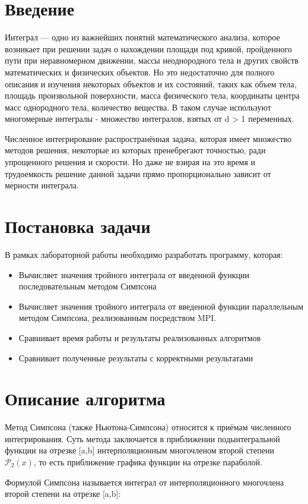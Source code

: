 \documentclass{report}
\begin{document}
\section*{Введение}
Интеграл — одно из важнейших понятий математического анализа, которое возникает при решении задач о нахождении площади под кривой, пройденного пути при неравномерном движении, массы неоднородного тела и других свойств математических и физических объектов. Но это недостаточно для полного описания и изучения некоторых объектов и их состояний, таких как объем тела, площадь произвольной поверхности, масса физического тела, координаты центра масс однородного тела, количество вещества. В таком случае используют многомерные интегралы - множество интегралов, взятых от d > 1 переменных.
\par Численное интегрирование распространённая задача, которая имеет множество методов решения, некоторые из которых пренебрегают точностью, ради упрощенного решения и скорости. Но даже не взирая на это время и трудоемкость решение данной задачи прямо пропорционально зависит от мерности интеграла.

\newpage


\section*{Постановка задачи}
В рамках лабораторной работы необходимо разработать программу, которая:  
\begin{itemize}
    \item Вычисляет значения тройного интеграла от введенной функции последовательным методом Симпсона
    \item Вычисляет значения тройного интеграла от введенной функции параллельным методом Симпсона, реализованным посредством MPI.
    \item Сравнивает время работы и результаты реализованных алгоритмов
    \item Сравнивает полученные результаты с корректными результатами

\end{itemize}
\newpage


\section*{Описание алгоритма}
Метод Симпсона (также Ньютона-Симпсона) относится к приёмам численного интегрирования. Суть метода заключается в приближении подынтегральной функции на отрезке [a,b] интерполяционным многочленом второй степени $\mathcal P_{2}(x)$, то есть приближение графика функции на отрезке параболой.
\par
Формулой Симпсона называется интеграл от интерполяционного многочлена второй степени на отрезке [a,b]:
\end{document}
